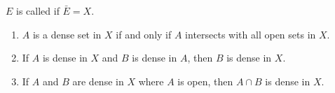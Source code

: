 \begin{definition}
$E$ is called  if $\bar{E}=X$.
\end{definition}

\begin{proposition}
\begin{enumerate}[label=(\arabic*)]
\item $A$ is a dense set in $X$ if and only if $A$ intersects with all open sets in $X$.
\item If $A$ is dense in $X$ and $B$ is dense in $A$, then $B$ is dense in $X$.
\item If $A$ and $B$ are dense in $X$ where $A$ is open, then $A\cap B$ is dense in $X$.
\end{enumerate}
\end{proposition}




